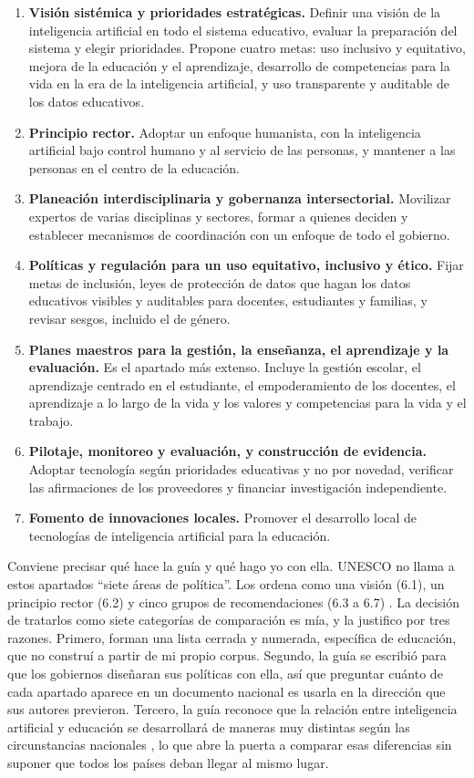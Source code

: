 \begin{enumerate}[label=6.\arabic*]
  \item \textbf{Visión sistémica y prioridades estratégicas.} Definir una visión de la
  inteligencia artificial en todo el sistema educativo, evaluar la preparación del sistema
  y elegir prioridades. Propone cuatro metas: uso inclusivo y equitativo, mejora de la
  educación y el aprendizaje, desarrollo de competencias para la vida en la era de la
  inteligencia artificial, y uso transparente y auditable de los datos educativos.
  \item \textbf{Principio rector.} Adoptar un enfoque humanista, con la inteligencia
  artificial bajo control humano y al servicio de las personas, y mantener a las personas
  en el centro de la educación.
  \item \textbf{Planeación interdisciplinaria y gobernanza intersectorial.} Movilizar
  expertos de varias disciplinas y sectores, formar a quienes deciden y establecer
  mecanismos de coordinación con un enfoque de todo el gobierno.
  \item \textbf{Políticas y regulación para un uso equitativo, inclusivo y ético.} Fijar
  metas de inclusión, leyes de protección de datos que hagan los datos educativos visibles
  y auditables para docentes, estudiantes y familias, y revisar sesgos, incluido el de
  género.
  \item \textbf{Planes maestros para la gestión, la enseñanza, el aprendizaje y la
  evaluación.} Es el apartado más extenso. Incluye la gestión escolar, el aprendizaje
  centrado en el estudiante, el empoderamiento de los docentes, el aprendizaje a lo largo
  de la vida y los valores y competencias para la vida y el trabajo.
  \item \textbf{Pilotaje, monitoreo y evaluación, y construcción de evidencia.} Adoptar
  tecnología según prioridades educativas y no por novedad, verificar las afirmaciones de
  los proveedores y financiar investigación independiente.
  \item \textbf{Fomento de innovaciones locales.} Promover el desarrollo local de
  tecnologías de inteligencia artificial para la educación.
\end{enumerate}

Conviene precisar qué hace la guía y qué hago yo con ella. UNESCO no llama a estos
apartados ``siete áreas de política''. Los ordena como una visión (6.1), un principio
rector (6.2) y cinco grupos de recomendaciones (6.3 a 6.7) \citep[p.~31]{miao2021guidance}.
La decisión de tratarlos como siete categorías de comparación es mía, y la justifico por
tres razones. Primero, forman una lista cerrada y numerada, específica de educación, que
no construí a partir de mi propio corpus. Segundo, la guía se escribió para que los
gobiernos diseñaran sus políticas con ella, así que preguntar cuánto de cada apartado
aparece en un documento nacional es usarla en la dirección que sus autores previeron.
Tercero, la guía reconoce que la relación entre inteligencia artificial y educación se
desarrollará de maneras muy distintas según las circunstancias nacionales
\citep[p.~5]{miao2021guidance}, lo que abre la puerta a comparar esas diferencias sin
suponer que todos los países deban llegar al mismo lugar.

